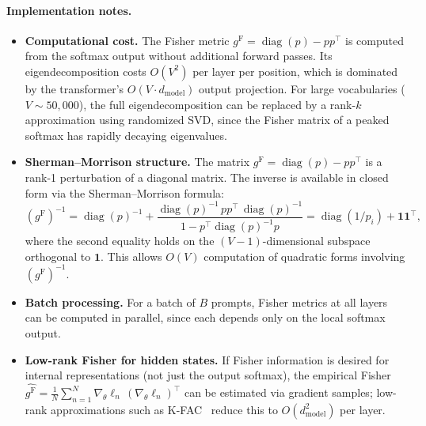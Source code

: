 \documentclass[11pt]{article}
\DeclareMathOperator{\diag}{diag}
\newcommand{\gF}{g^{\mathrm{F}}}
\theoremstyle{remark}
\begin{document}
\paragraph{Implementation notes.}
\begin{itemize}[leftmargin=*]
  \item \textbf{Computational cost.}  The Fisher metric
  $\gF = \diag(p) - pp^\top$ is computed from the softmax output without
  additional forward passes.  Its eigendecomposition costs $O(V^2)$ per layer
  per position, which is dominated by the transformer's $O(V \cdot d_{\mathrm{model}})$
  output projection.  For large vocabularies ($V \sim 50{,}000$), the full
  eigendecomposition can be replaced by a rank-$k$ approximation using
  randomized SVD, since the Fisher matrix of a peaked softmax has rapidly
  decaying eigenvalues.

  \item \textbf{Sherman--Morrison structure.}
  The matrix $\gF = \diag(p) - pp^\top$ is a rank-1 perturbation of a
  diagonal matrix.  The inverse is available in closed form via the
  Sherman--Morrison formula:
  \[
  (\gF)^{-1} = \diag(p)^{-1} + \frac{\diag(p)^{-1}\, pp^\top\, \diag(p)^{-1}}
  {1 - p^\top \diag(p)^{-1} p}
  = \diag(1/p_i) + \mathbf{1}\mathbf{1}^\top,
  \]
  where the second equality holds on the $(V{-}1)$-dimensional subspace
  orthogonal to $\mathbf{1}$.  This allows $O(V)$ computation of quadratic
  forms involving $(\gF)^{-1}$.

  \item \textbf{Batch processing.}  For a batch of $B$ prompts, Fisher metrics
  at all layers can be computed in parallel, since each depends only on the
  local softmax output.

  \item \textbf{Low-rank Fisher for hidden states.}
  If Fisher information is desired for internal representations (not just the
  output softmax), the empirical Fisher
  $\hat{\gF} = \frac{1}{N}\sum_{n=1}^N
  \nabla_\theta \ell_n \,(\nabla_\theta \ell_n)^\top$
  can be estimated via gradient samples; low-rank approximations such as
  K-FAC~\cite{martens2020} reduce this to $O(d_{\mathrm{model}}^2)$ per layer.
\end{itemize}
\end{document}
